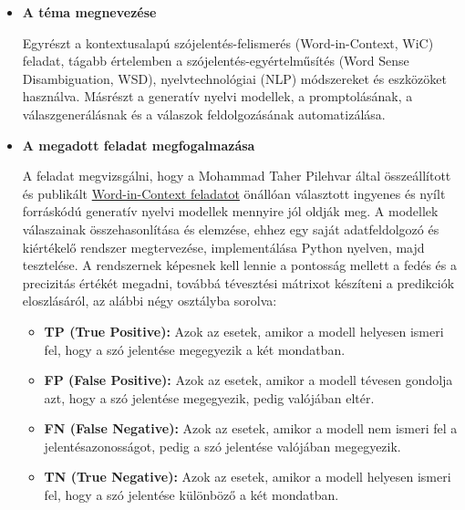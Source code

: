 \documentclass[12pt]{report}
\theoremstyle{definition}
\begin{document}
\begin{itemize}
\item \textbf{A téma megnevezése}

    Egyrészt a kontextusalapú szójelentés-felismerés (Word-in-Context, WiC) feladat, tágabb értelemben a szójelentés-egyértelműsítés (Word Sense Disambiguation,
    WSD), nyelvtechnológiai (NLP) módszereket és eszközöket használva. Másrészt a generatív nyelvi modellek, a promptolásának, a válaszgenerálásnak és a válaszok feldolgozásának automatizálása.

\item \textbf{A megadott feladat megfogalmazása}

      A feladat megvizsgálni, hogy a Mohammad Taher Pilehvar által összeállított és publikált \href{https://pilehvar.github.io/wic/}{Word-in-Context feladatot} önállóan választott ingyenes és nyílt forráskódú generatív nyelvi modellek mennyire jól oldják meg. A modellek válaszainak összehasonlítása és elemzése, ehhez egy saját adatfeldolgozó és  kiértékelő rendszer megtervezése, implementálása Python nyelven, majd tesztelése. A rendszernek képesnek kell lennie a pontosság mellett a fedés és a precizitás értékét megadni, továbbá tévesztési mátrixot készíteni a predikciók eloszlásáról, az alábbi négy osztályba sorolva:
      \begin{itemize}
        \item \textbf{TP (True Positive):} Azok az esetek, amikor a modell helyesen ismeri fel, hogy a szó jelentése megegyezik a két mondatban.
        \item \textbf{FP (False Positive):} Azok az esetek, amikor a modell tévesen gondolja azt, hogy a szó jelentése megegyezik, pedig valójában eltér.
        \item \textbf{FN (False Negative):} Azok az esetek, amikor a modell nem ismeri fel a jelentésazonosságot, pedig a szó jelentése valójában megegyezik.
        \item \textbf{TN (True Negative):} Azok az esetek, amikor a modell helyesen ismeri fel, hogy a szó jelentése különböző a két mondatban.
      \end{itemize}


\end{itemize}
\end{document}
